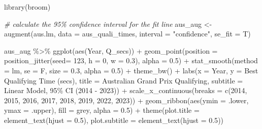 \documentclass[
]{book}
\newenvironment{Shaded}{\begin{snugshade}}{\end{snugshade}}
\newcommand{\AttributeTok}[1]{\textcolor[rgb]{0.77,0.63,0.00}{#1}}
\newcommand{\CommentTok}[1]{\textcolor[rgb]{0.56,0.35,0.01}{\textit{#1}}}
\newcommand{\DecValTok}[1]{\textcolor[rgb]{0.00,0.00,0.81}{#1}}
\newcommand{\FloatTok}[1]{\textcolor[rgb]{0.00,0.00,0.81}{#1}}
\newcommand{\FunctionTok}[1]{\textcolor[rgb]{0.00,0.00,0.00}{#1}}
\newcommand{\NormalTok}[1]{#1}
\newcommand{\OtherTok}[1]{\textcolor[rgb]{0.56,0.35,0.01}{#1}}
\newcommand{\SpecialCharTok}[1]{\textcolor[rgb]{0.00,0.00,0.00}{#1}}
\newcommand{\StringTok}[1]{\textcolor[rgb]{0.31,0.60,0.02}{#1}}
\begin{document}
\begin{Shaded}
\begin{Highlighting}[]
\FunctionTok{library}\NormalTok{(broom)}

\CommentTok{\# calculate the 95\% confidence interval for the fit line}
\NormalTok{aus\_aug }\OtherTok{\textless{}{-}} \FunctionTok{augment}\NormalTok{(aus.lm, }\AttributeTok{data =}\NormalTok{ aus\_quali\_times, }\AttributeTok{interval =} \StringTok{"confidence"}\NormalTok{, }\AttributeTok{se\_fit =}\NormalTok{ T)}


\NormalTok{aus\_aug }\SpecialCharTok{\%\textgreater{}\%} 
  \FunctionTok{ggplot}\NormalTok{(}\FunctionTok{aes}\NormalTok{(Year, Q\_secs)) }\SpecialCharTok{+}
  \FunctionTok{geom\_point}\NormalTok{(}\AttributeTok{position =} \FunctionTok{position\_jitter}\NormalTok{(}\AttributeTok{seed=} \DecValTok{123}\NormalTok{, }\AttributeTok{h =} \DecValTok{0}\NormalTok{, }\AttributeTok{w =} \FloatTok{0.3}\NormalTok{), }\AttributeTok{alpha =} \FloatTok{0.5}\NormalTok{) }\SpecialCharTok{+}
  \FunctionTok{stat\_smooth}\NormalTok{(}\AttributeTok{method =} \StringTok{\textquotesingle{}lm\textquotesingle{}}\NormalTok{, }\AttributeTok{se =}\NormalTok{ F, }\AttributeTok{size =} \FloatTok{0.3}\NormalTok{, }\AttributeTok{alpha =} \FloatTok{0.5}\NormalTok{) }\SpecialCharTok{+} 
  \FunctionTok{theme\_bw}\NormalTok{() }\SpecialCharTok{+}
  \FunctionTok{labs}\NormalTok{(}\AttributeTok{x =} \StringTok{\textquotesingle{}Year\textquotesingle{}}\NormalTok{,}
       \AttributeTok{y =} \StringTok{\textquotesingle{}Best Qualifying Time (secs)\textquotesingle{}}\NormalTok{,}
       \AttributeTok{title =} \StringTok{\textquotesingle{}Australian Grand Prix Qualifying\textquotesingle{}}\NormalTok{,}
       \AttributeTok{subtitle =} \StringTok{\textquotesingle{}Linear Model, 95\% CI (2014 {-} 2023)\textquotesingle{}}\NormalTok{) }\SpecialCharTok{+}
  \FunctionTok{scale\_x\_continuous}\NormalTok{(}\AttributeTok{breaks =} \FunctionTok{c}\NormalTok{(}\DecValTok{2014}\NormalTok{, }\DecValTok{2015}\NormalTok{, }\DecValTok{2016}\NormalTok{, }\DecValTok{2017}\NormalTok{, }\DecValTok{2018}\NormalTok{, }\DecValTok{2019}\NormalTok{, }\DecValTok{2022}\NormalTok{, }\DecValTok{2023}\NormalTok{)) }\SpecialCharTok{+}
  \FunctionTok{geom\_ribbon}\NormalTok{(}\FunctionTok{aes}\NormalTok{(}\AttributeTok{ymin =}\NormalTok{ .lower, }\AttributeTok{ymax =}\NormalTok{ .upper), }\AttributeTok{fill =} \StringTok{\textquotesingle{}grey\textquotesingle{}}\NormalTok{, }\AttributeTok{alpha =} \FloatTok{0.5}\NormalTok{) }\SpecialCharTok{+}
  \FunctionTok{theme}\NormalTok{(}\AttributeTok{plot.title =} \FunctionTok{element\_text}\NormalTok{(}\AttributeTok{hjust =} \FloatTok{0.5}\NormalTok{),}
        \AttributeTok{plot.subtitle =} \FunctionTok{element\_text}\NormalTok{(}\AttributeTok{hjust =} \FloatTok{0.5}\NormalTok{))}
\end{Highlighting}
\end{Shaded}
\end{document}
